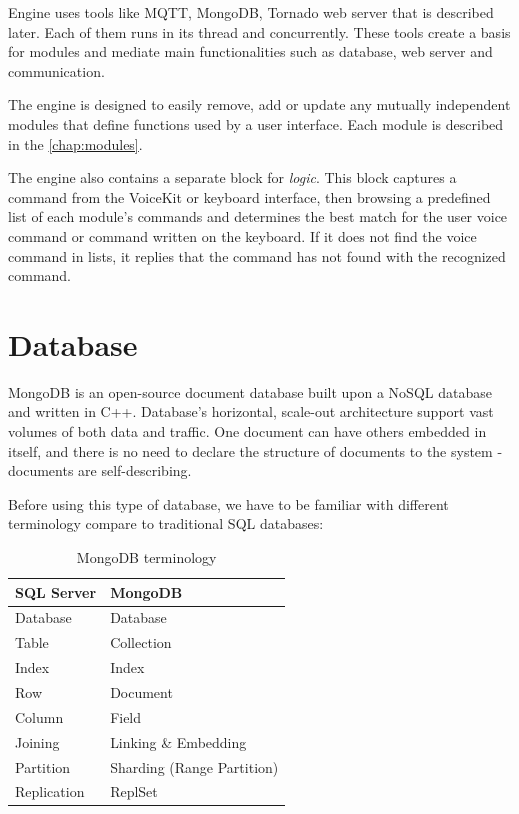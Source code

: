 Engine uses tools like MQTT, MongoDB, Tornado web server that is described later. Each of them runs in its thread and concurrently. These tools create a basis for modules and mediate main functionalities such as database, web server and communication. 

The engine is designed to easily remove, add or update any mutually independent modules that define functions used by a user interface. Each module is described in the \cref{chap:modules}.

The engine also contains a separate block for \textit{logic}. This block captures a command from the VoiceKit or keyboard interface, then browsing a predefined list of each module's commands and determines the best match for the user voice command or command written on the keyboard. If it does not find the voice command in lists, it replies that the command has not found with the recognized command.

\section{Database} \label{section:database}



MongoDB is an open-source document database built upon a NoSQL database and written in C++. Database's horizontal, scale-out architecture support vast volumes of both data and traffic. One document can have others embedded in itself, and there is no need to declare the structure of documents to the system - documents are self-describing.\citep{mongoDB_jayaram_2020}

Before using this type of database, we have to be familiar with different terminology compare to traditional SQL databases: 
\begin{table}[H]
	\centering
	\begin{tabular}{|l|l|} \hline
		SQL Server & MongoDB \\ \hline\hline
		Database & Database \\ \hline
		Table & Collection \\ \hline
		Index & Index \\ \hline
		Row & Document \\ \hline
		Column & Field \\ \hline
		Joining & Linking \& Embedding \\ \hline
		Partition & Sharding (Range Partition) \\ \hline
		Replication & ReplSet\\ \hline
	\end{tabular}
	\caption{MongoDB terminology}
	\label{tab:mongoDB_terminology}
\end{table}

